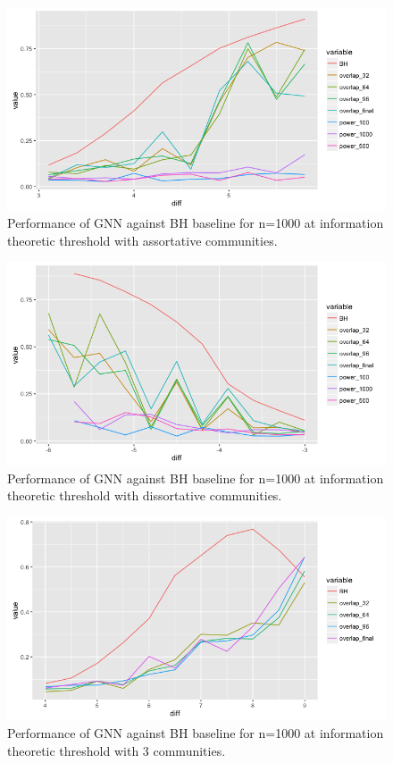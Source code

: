 \begin{figure}[h]
\begin{center}
  \includegraphics[scale=0.55]{asso.png}
  \caption{Performance of GNN against BH baseline for n=1000 at information theoretic threshold with assortative communities.}
  \label{fig:ass}
\end{center}
\end{figure}

\begin{figure}[h]
\begin{center}
  \includegraphics[scale=0.55]{diss.png}
  \caption{Performance of GNN against BH baseline for n=1000 at information theoretic threshold with dissortative communities.}
  \label{fig:diss}
\end{center}
\end{figure}

\begin{figure}[h]
\begin{center}
  \includegraphics[scale=0.55]{k3.png}
  \caption{Performance of GNN against BH baseline for n=1000 at information theoretic threshold with 3 communities.}
  \label{fig:k3}
\end{center}
\end{figure}


